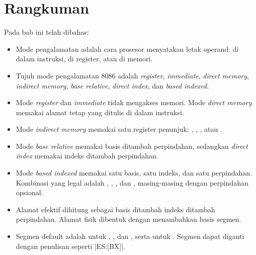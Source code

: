 \section{Rangkuman}
\label{sec:rangkuman-bab12}

Pada bab ini telah dibahas:

\begin{itemize}
    \item Mode pengalamatan adalah cara prosesor menyatakan letak
          operand: di dalam instruksi, di register, atau di memori.

    \item Tujuh mode pengalamatan 8086 adalah \textit{register},
          \textit{immediate}, \textit{direct memory}, \textit{indirect
          memory}, \textit{base relative}, \textit{direct index}, dan
          \textit{based indexed}.

    \item Mode \textit{register} dan \textit{immediate} tidak
          mengakses memori. Mode \textit{direct memory} memakai
          alamat tetap yang ditulis di dalam instruksi.

    \item Mode \textit{indirect memory} memakai satu register
          penunjuk: , , , atau .

    \item Mode \textit{base relative} memakai basis ditambah
          perpindahan, sedangkan \textit{direct index} memakai indeks
          ditambah perpindahan.

    \item Mode \textit{based indexed} memakai satu basis, satu indeks,
          dan satu perpindahan. Kombinasi yang legal adalah
          \code{[BX+SI]}, \code{[BX+DI]}, \code{[BP+SI]}, dan
          \code{[BP+DI]}, masing-masing dengan perpindahan opsional.

    \item Alamat efektif dihitung sebagai basis ditambah indeks
          ditambah perpindahan. Alamat fisik dibentuk dengan
          menambahkan basis segmen.

    \item Segmen default adalah  untuk , ,
          dan , serta  untuk . Segmen dapat
          diganti dengan penulisan seperti \lstasm|ES:[BX]|.
\end{itemize}

